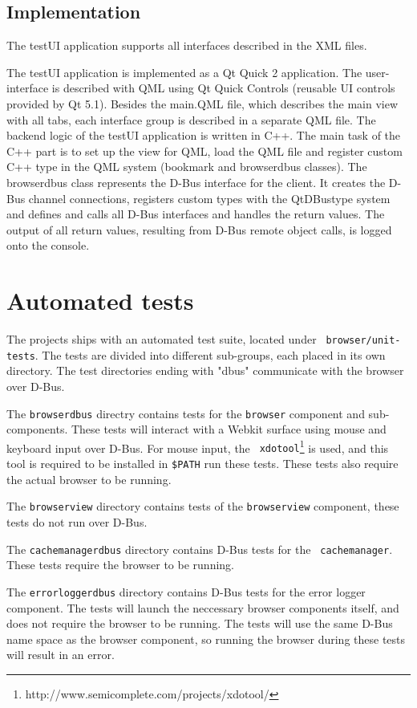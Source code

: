 \documentclass{pelagicore}
\begin{document}
\subsection{Implementation}
The testUI application supports all interfaces described in the XML files.

The testUI application is implemented as a Qt Quick 2 application. The
user-interface is described with QML using Qt Quick Controls (reusable UI
controls provided by Qt 5.1).  Besides the main.QML file, which describes the
main view with all tabs, each interface group is described in a separate QML
file. The backend logic of the testUI application is written in C++. The main
task of the C++ part is to set up the view for QML, load the QML file and
register custom C++ type in the QML system (bookmark and browserdbus classes).
The browserdbus class represents the D-Bus interface for the client. It creates
the D-Bus channel connections, registers custom types with the QtDBustype system
and defines and calls all D-Bus interfaces and handles the return values. The
output of all return values, resulting from D-Bus remote object calls, is logged
onto the console.

\section{Automated tests}
The projects ships with an automated test suite, located under {\tt
browser/unit-tests}. The tests are divided into different sub-groups, each
placed in its own directory. The test directories ending with "dbus"
communicate with the browser over D-Bus.

The {\tt browserdbus} directry contains tests for the {\tt browser} component
and sub-components. These tests will interact with a Webkit surface using mouse
and keyboard input over D-Bus. For mouse input, the {\tt
xdotool}\footnote{http://www.semicomplete.com/projects/xdotool/} is used, and
this tool is required to be installed in {\tt \$PATH} run these tests. These
tests also require the actual browser to be running.

The {\tt browserview} directory contains tests of the {\tt browserview}
component, these tests do not run over D-Bus.

The {\tt cachemanagerdbus} directory contains D-Bus tests for the {\tt
cachemanager}. These tests require the browser to be running.

The {\tt errorloggerdbus} directory contains D-Bus tests for the error logger
component. The tests will launch the neccessary browser components itself, and
does not require the browser to be running. The tests will use the same D-Bus
name space as the browser component, so running the browser during these tests
will result in an error.
\end{document}
